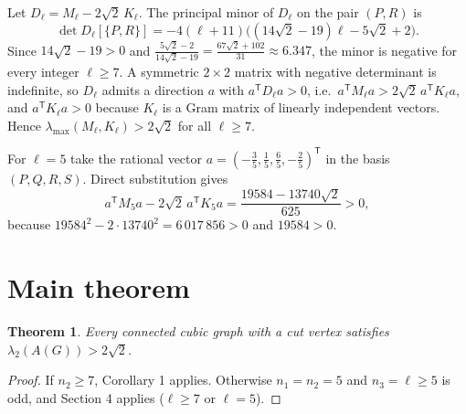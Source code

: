 \documentclass[11pt,a4paper]{article}
\theoremstyle{plain}
\newtheorem{theorem}{Theorem}[section]
\theoremstyle{definition}
\newcommand{\bdG}{A(G)}
\begin{document}
Let $D_\ell=M_\ell-2\sqrt2\,K_\ell$. The principal minor of $D_\ell$ on the
pair $(P,R)$ is
\[
  \det D_\ell[\{P,R\}]
  =-4(\ell+11)\Big((14\sqrt2-19)\ell-5\sqrt2+2\Big).
\tag{5.1}
\]
Since $14\sqrt2-19>0$ and
$\frac{5\sqrt2-2}{14\sqrt2-19}=\frac{67\sqrt2+102}{31}\approx6.347$, the minor
is negative for every integer $\ell\ge7$. A symmetric $2\times2$ matrix with
negative determinant is indefinite, so $D_\ell$ admits a direction $a$ with
$a^{\mathsf T}D_\ell a>0$, i.e.\ $a^{\mathsf T}M_\ell a>2\sqrt2\,a^{\mathsf T}K_\ell a$,
and $a^{\mathsf T}K_\ell a>0$ because $K_\ell$ is a Gram matrix of linearly
independent vectors. Hence $\lambda_{\max}(M_\ell,K_\ell)>2\sqrt2$ for all
$\ell\ge7$.

For $\ell=5$ take the rational vector
$a=(-\tfrac35,\tfrac15,\tfrac65,-\tfrac25)^{\mathsf T}$ in the basis
$(P,Q,R,S)$. Direct substitution gives
\[
  a^{\mathsf T}M_5a-2\sqrt2\,a^{\mathsf T}K_5a
  =\frac{19584-13740\sqrt2}{625}>0,
\]
because $19584^2-2\cdot13740^2=6\,017\,856>0$ and $19584>0$.

\section{Main theorem}

\begin{theorem}
Every connected cubic graph with a cut vertex satisfies
$\lambda_2(\bdG)>2\sqrt2$.
\end{theorem}

\begin{proof}
If $n_2\ge7$, Corollary 1 applies. Otherwise $n_1=n_2=5$ and $n_3=\ell\ge5$ is
odd, and Section 4 applies ($\ell\ge7$ or $\ell=5$).
\end{proof}
\end{document}
